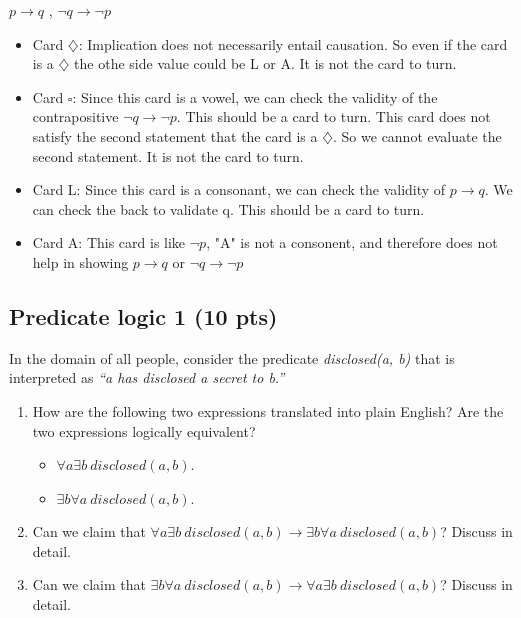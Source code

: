 \documentclass[12pt]{article}
\begin{document}
$ p \rightarrow q$ , $ \neg q \rightarrow \neg p$
\begin{itemize}
	\item Card \textbf{$\diamondsuit$}: Implication does not necessarily entail causation. So even if the card is a \textbf{$\diamondsuit$} the othe side value could be L or A. It is not the card to turn.

	\item Card \textbf{$\square$}: Since this card is a vowel, we can check the validity of the contrapositive $ \neg q \rightarrow \neg p$. This should be a card to turn. This card does not satisfy the second statement that the card is a \textbf{$\diamondsuit$}. So we cannot evaluate the second statement. It is not the card to turn.
	
	\item Card L: Since this card is a consonant, we can check the validity of $ p \rightarrow q$. We can check the back to validate q. This should be a card to turn.
	
	\item Card A: This card is like $ \neg p $, "A" is not a consonent, and therefore does not help in showing $ p \rightarrow q$ or $ \neg q \rightarrow \neg p$
	
\end{itemize}

\newpage

\subsection{Predicate logic 1 (10 pts)}

In the domain of all people, consider the predicate \textit{disclosed(a, b)} that is interpreted as \textit{``a has disclosed a secret to  b.''}
\begin{enumerate}
\item How are the following two expressions translated into plain English? Are the two expressions logically equivalent?
\begin{itemize}
	\item $\forall a \exists b~disclosed(a, b)$.
	\item $\exists b \forall a ~disclosed(a, b)$.
\end{itemize} 
\item Can we claim that $\forall a \exists b~disclosed(a, b) \rightarrow \exists b \forall a ~disclosed(a, b)$? Discuss in detail.
\item Can we claim that $\exists b \forall a ~disclosed(a, b) \rightarrow \forall a \exists b~disclosed(a, b)$? Discuss in detail.
\end{enumerate}
\end{document}

